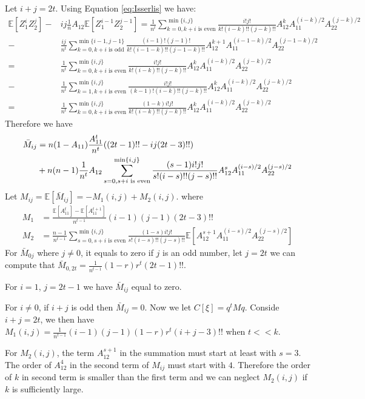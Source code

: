 \documentclass{article}
\def\E{\mathbb{E}}
\begin{document}
Let $i+j=2t$. Using Equation \eqref{eq:Isserlis} we have:
\begin{align*}
\E[Z_1^i Z_2^j]  -  & ij \frac{1}{n}A_{12}\E[Z_1^{i-1}Z_2^{j-1}] =
\frac{1}{n^t} \sum_{k=0, k+i \textrm{ is even}}^{\min\{i,j\}}
\frac{i! j!}{k! (i-k)!!(j-k)!!}
A_{12}^k A_{11}^{(i-k)/2}A_{22}^{(j-k)/2} \\
- & \frac{ij}{n^t} \sum_{k=0, k+i \textrm{ is odd}}^{\min\{i-1,j-1\}}
\frac{(i-1)! (j-1)!}{k! (i-1-k)!!(j-1-k)!!}
A_{12}^{k+1} A_{11}^{(i-1-k)/2}A_{22}^{(j-1-k)/2} \\
= &\frac{1}{n^t} \sum_{k=0, k+i \textrm{ is even}}^{\min\{i,j\}}
\frac{i! j!}{k! (i-k)!!(j-k)!!}
A_{12}^k A_{11}^{(i-k)/2}A_{22}^{(j-k)/2} \\
- & \frac{1}{n^t} \sum_{k=1, k+i \textrm{ is even}}^{\min\{i,j\}}
\frac{i! j!}{(k-1)! (i-k)!!(j-k)!!}
A_{12}^{k} A_{11}^{(i-k)/2}A_{22}^{(j-k)/2} \\
= &\frac{1}{n^t} \sum_{k=0, k+i \textrm{ is even}}^{\min\{i,j\}}
\frac{(1-k)i! j!}{k! (i-k)!!(j-k)!!}A_{12}^k A_{11}^{(i-k)/2}A_{22}^{(j-k)/2} 
\end{align*}
Therefore we have
\begin{align}
\bar{M}_{ij} &= n(1-A_{11})\frac{A^t_{11}}{n^t}  ((2t-1)!!- ij (2t-3)!!)  \notag\\
&+n(n-1)\frac{1}{n^t}A_{12} \sum_{s=0, s+i \textrm{ is even}}^{\min\{i,j\}}
\frac{(s-1)i!j!}{s!(i-s)!!(j-s)!!}
A_{12}^s A_{11}^{(i - s) /2}A_{22}^{(j - s)/2} \label{eq:Mij_second}
\end{align}
Let $M_{ij} = \E[\bar{M}_{ij}] = -M_1(i,j) + M_2(i,j)$.
where
\begin{align}
M_1 & = \frac{\E[A^t_{11}] - \E[A^{t+1}_{11}]}{n^{t-1}}  (i-1)(j-1)(2t-3)!!  \\
M_2 & = \frac{n-1}{n^{t-1}} \sum_{s=0, s+i \textrm{ is even}}^{\min\{i,j\}}
\frac{(1-s)i!j!}{s!(i-s)!!(j-s)!!}
\E[A_{12}^{s+1} A_{11}^{(i - s) /2}A_{22}^{(j - s)/2} ]
\end{align}
For $\bar{M}_{0j}$ where $j \neq 0$,
it equals to zero if $j$ is an odd number,
let $j=2t$ we can compute that
$\bar{M}_{0,2t}=\frac{1}{n^{t-1}} (1-r)r^t (2t-1)!! $.

For $i = 1$, $ j = 2 t - 1$ we have
$\bar{M}_{ij}$ equal to zero.

For $i \neq 0$, if $i+j$ is odd then $\bar{M}_{ij} = 0$. Now we let 
$C[\xi]=q^t M q$.
Conside $i+j = 2t$, we then have
$M_1(i,j) =
\frac{1}{n^{t-1}}(i-1)(j-1) (1-r)r^t (i+j-3)!!$ when $ t << k$.

For $M_2(i,j)$, the term $A_{12}^{s+1}$ in the summation must start at least with $s=3$.
The order of $A_{12}^4$ in
the second term of $M_{ij}$ must start with $4$.
Therefore the order of $k$ in second term is smaller than
the first term and we can neglect $M_2(i,j)$
if $k$ is sufficiently large.
\end{document}
